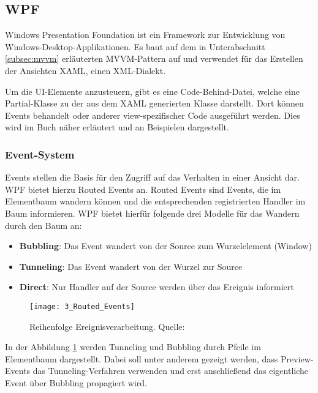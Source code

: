 \subsection{WPF}
\label{subsec:WPF}
Windows Presentation Foundation \cite{microsoft_wpf_overview} ist ein Framework zur Entwicklung von Windows-Desktop-Applikationen. Es baut auf dem in Unterabschnitt \ref{subsec:mvvm} erläuterten MVVM-Pattern auf und verwendet für das Erstellen der Ansichten XAML, einen XML-Dialekt. 

Um die UI-Elemente anzusteuern, gibt es eine Code-Behind-Datei, welche eine Partial-Klasse zu der aus dem XAML generierten Klasse darstellt. Dort können Events behandelt oder anderer view-spezifischer Code ausgeführt werden. Dies wird im Buch \cite{james2015pro} näher erläutert und an Beispielen dargestellt.

\subsubsection{Event-System}
Events stellen die Basis für den Zugriff auf das Verhalten in einer Ansicht dar. WPF bietet hierzu Routed Events \cite{microsoft_wpf_routed_events_overview} an. Routed Events sind Events, die im Elementbaum wandern können und die entsprechenden registrierten Handler im Baum informieren. WPF bietet hierfür folgende drei Modelle für das Wandern durch den Baum an:

\begin{itemize}
    \item \textbf{Bubbling}: Das Event wandert von der Source zum Wurzelelement (Window)
    \item \textbf{Tunneling}: Das Event wandert von der Wurzel zur Source
    \item \textbf{Direct}: Nur Handler auf der Source werden über das Ereignis informiert
\end{itemize}

\begin{figure}[H]
    \centering
    \texttt{[image: 3\_Routed\_Events]}
    \caption{Reihenfolge Ereignisverarbeitung. Quelle: \cite{microsoft_wpf_routed_events_overview}}
    \label{fig:routed_events}
\end{figure}

In der Abbildung \ref{fig:routed_events} werden Tunneling und Bubbling durch Pfeile im Elementbaum dargestellt. Dabei soll unter anderem gezeigt werden, dass Preview-Events das Tunneling-Verfahren verwenden und erst anschließend das eigentliche Event über Bubbling propagiert wird.

